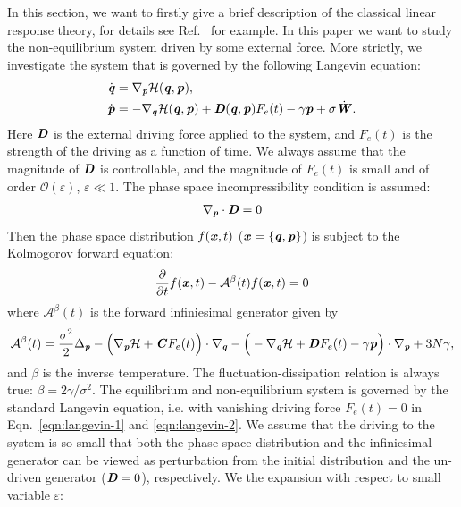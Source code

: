 \documentclass[aip,jcp,a4paper,reprint,onecolumn]{revtex4-1}
\newcommand{\vect}[1]{\textbf{\textit{#1}}}
\newcommand{\mh}{\mathcal H}
\newcommand{\mo}{\mathcal O}
\newcommand{\fwg}{{\mathcal A}}
\begin{document}
In this section, we want to firstly give a brief description of the classical linear response
theory, for details see Ref.~\cite{tuckeman2010statistical} for
example.
In this paper we want to study the non-equilibrium system driven by some external force.
More strictly, we investigate the system that is governed by the
following Langevin equation:
\begin{align}\label{eqn:langevin-1}
  \dot{\vect q} & = \nabla_{\vect p}\mh(\vect q,\vect p), \\\label{eqn:langevin-2}
  \dot{\vect p} & =- \nabla_{\vect q}\mh(\vect q,\vect p)
  + \vect D(\vect q,\vect p) F_e(t)
  - \gamma\vect p
  + \sigma\dot{\vect W}.
\end{align}
Here $\vect D$ is the external driving force applied to the system, and
$F_e(t)$ is the strength of the driving as a function of time.
We always assume that the magnitude of $\vect D$ is controllable, and
the magnitude of $F_e(t)$ is small and of order $\mo (\varepsilon)$, $\varepsilon \ll 1$.
The phase space incompressibility condition is assumed:
\begin{align}
  \nabla_{\vect p}\cdot\vect D = 0
\end{align}
Then the phase space distribution $f(\vect x, t)$ ($\vect x = \{\vect
q, \vect p\}$) is subject to the Kolmogorov forward equation:
\begin{align}\label{eqn:orig-forward}
  \frac{\partial}{\partial t} f(\vect x, t) - \fwg^\beta(t) f(\vect x, t) = 0
\end{align}
where $\fwg^\beta(t)$ is the forward infiniesimal generator given by
\begin{align}
  \fwg^\beta(t) =
  \frac{\sigma^2}2\Delta_{\vect p}
  - \Big(
  \nabla_{\vect p}\mh + \vect C F_e(t)
  \Big)\cdot\nabla_{\vect q}
  - \Big(
  -\nabla_{\vect q}\mh +
  \vect D F_e(t) - \gamma\vect p
  \Big)\cdot\nabla_{\vect p}
  + 3N\gamma,
\end{align}
and $\beta$ is the inverse temperature.
The fluctuation-dissipation relation is always true:
$\beta = 2\gamma / \sigma^2$.
The equilibrium and non-equilibrium system
is governed by
the standard Langevin equation, i.e. with
vanishing driving force $F_e(t) = 0$ in
Eqn.~\eqref{eqn:langevin-1} and \eqref{eqn:langevin-2}.
We assume that the driving to the
system is so small that both the phase space distribution and the
infiniesimal generator can be viewed as perturbation from the initial
distribution and the un-driven generator
($\vect D = 0$),
respectively. We the expansion with respect to small
variable $\varepsilon$:
\end{document}
